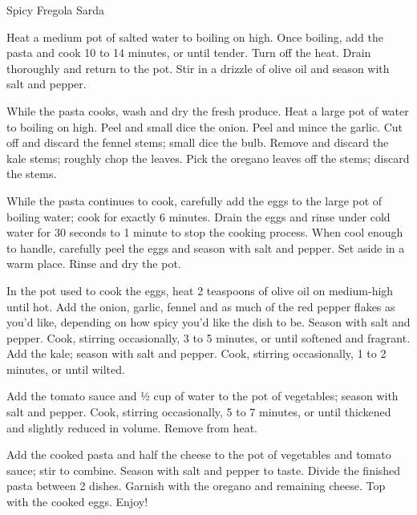 \begin{recipe}[\vegetarian]{Spicy Fregola Sarda}

    \begin{ingredients}
    \end{ingredients}

    \begin{instructions}
        Heat a medium pot of salted water to boiling on high. Once boiling, add the pasta and cook 10 to 14 minutes, or until tender. Turn off the heat. Drain thoroughly and return to the pot. Stir in a drizzle of olive oil and season with salt and pepper.

        While the pasta cooks, wash and dry the fresh produce. Heat a large pot of water to boiling on high. Peel and small dice the onion. Peel and mince the garlic. Cut off and discard the fennel stems; small dice the bulb. Remove and discard the kale stems; roughly chop the leaves. Pick the oregano leaves off the stems; discard the stems.

        While the pasta continues to cook, carefully add the eggs to the large pot of boiling water; cook for exactly 6 minutes. Drain the eggs and rinse under cold water for 30 seconds to 1 minute to stop the cooking process. When cool enough to handle, carefully peel the eggs and season with salt and pepper. Set aside in a warm place. Rinse and dry the pot.

        In the pot used to cook the eggs, heat 2 teaspoons of olive oil on medium-high until hot. Add the onion, garlic, fennel and as much of the red pepper flakes as you’d like, depending on how spicy you’d like the dish to be. Season with salt and pepper. Cook, stirring occasionally, 3 to 5 minutes, or until softened and fragrant. Add the kale; season with salt and pepper. Cook, stirring occasionally, 1 to 2 minutes, or until wilted.

        Add the tomato sauce and ½ cup of water to the pot of vegetables; season with salt and pepper. Cook, stirring occasionally, 5 to 7 minutes, or until thickened and slightly reduced in volume. Remove from heat.

        Add the cooked pasta and half the cheese to the pot of vegetables and tomato sauce; stir to combine. Season with salt and pepper to taste. Divide the finished pasta between 2 dishes. Garnish with the oregano and remaining cheese. Top with the cooked eggs. Enjoy!
    \end{instructions}
\end{recipe}
